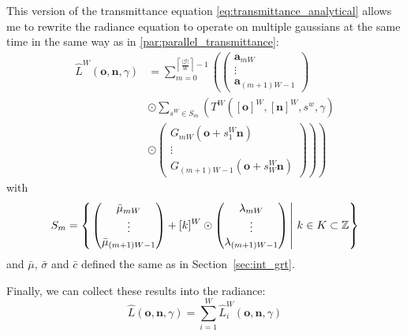 \documentclass[a4paper, 11pt]{memoir}
\begin{document}
    This version of the \gls{transmittance} equation \eqref{eq:transmittance_analytical} allows me to rewrite the \gls{radiance} equation to operate on
    multiple gaussians at the same time in the same way as in \ref{par:parallel_transmittance}:
    \begin{equation}
        \begin{aligned}
            \hat{L}^W(\mathbf{o}, \mathbf{n}, \gamma) &= \sum_{m = 0}^{\left\lceil \frac{|\mathcal{G}|}{W} \right\rceil - 1} \left( \begin{pmatrix}
                \mathbf{a}_{mW}\\ \vdots \\ \mathbf{a}_{(m+1)W - 1}
            \end{pmatrix} \right.\\
            &\odot \sum_{s^W \in S_m} \left( T^W([\mathbf{o}]^W, [\mathbf{n}]^W, s^w, \gamma)\right.\\
            &\odot \left.\left.\begin{pmatrix}
                G_{mW}(\mathbf{o} + s^W_1\mathbf{n})\\ \vdots\\ G_{(m+1)W - 1}(\mathbf{o} + s^W_W\mathbf{n})
            \end{pmatrix}\right)\right)
        \end{aligned}
        \label{eq:radiance_parallel_gaussians}
    \end{equation}
    with
    \[ S_m = \left\{\left. \begin{pmatrix}
        \bar{\mu}_{mW}\\ \vdots\\ \bar{\mu}_{(m+1)W - 1}
    \end{pmatrix} + [k]^W \odot \begin{pmatrix}
        \lambda_{mW}\\ \vdots\\ \lambda_{(m+1)W - 1}
    \end{pmatrix} \,\right|\, k \in K \subset \mathbb{Z} \right\} \]
    and $\bar{\mu}$, $\bar{\sigma}$ and $\bar{c}$ defined the same as in Section~\ref{sec:int_grt}.

    Finally, we can collect these results into the \gls{radiance}:
    \begin{equation}
        \hat{L}(\mathbf{o}, \mathbf{n}, \gamma) = \sum_{i = 1}^W \hat{L}^W_i(\mathbf{o}, \mathbf{n}, \gamma)
        \label{eq:radiance_parallel_final}
    \end{equation}
\end{document}
